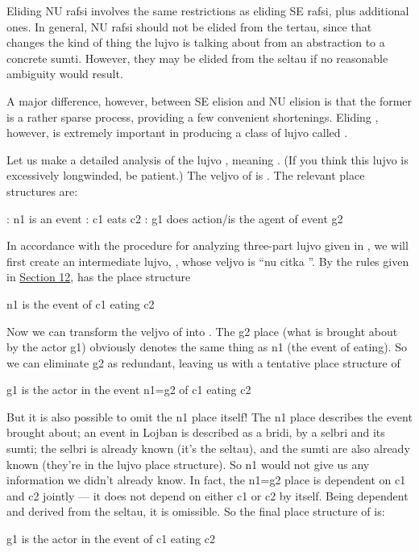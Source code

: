 Eliding NU rafsi involves the same restrictions as eliding
    SE rafsi, plus additional ones. In general, NU rafsi should not
    be elided from the tertau, since that changes the kind of thing
    the lujvo is talking about from an abstraction to a concrete
    sumti. However, they may be elided from the seltau if no
    reasonable ambiguity would result.

A major difference, however, between SE elision and NU
    elision is that the former is a rather sparse process,
    providing a few convenient shortenings. Eliding ,
    however, is extremely important in producing a class of lujvo
    called .

Let us make a detailed analysis of the lujvo
    , meaning . (If you think this lujvo
    is excessively longwinded, be patient.) The veljvo of
     is . The relevant place
    structures are:
\begin{example}
: n1 is an event\n
{}: c1 eats c2\n
{}: g1 does action/is the agent of event g2
\end{example}

In accordance with the procedure for analyzing three-part
    lujvo given in , we will first
    create an intermediate lujvo, , whose veljvo is ``nu
    citka ''. By the rules given in \hyperref[sec:12:12]{Section
    12},  has the place structure
\begin{example}
n1 is the event of c1 eating c2
\end{example}

Now we can transform the veljvo of  into
    . The g2 place (what is brought about by the
    actor g1) obviously denotes the same thing as n1 (the event of
    eating). So we can eliminate g2 as redundant, leaving us with a
    tentative place structure of
\begin{example}
g1 is the actor in the event n1=g2 of c1 eating c2
\end{example}

But it is also possible to omit the n1 place itself! The n1
    place describes the event brought about; an event in Lojban is
    described as a bridi, by a selbri and its sumti; the selbri is
    already known (it's the seltau), and the sumti are also already
    known (they're in the lujvo place structure). So n1 would not
    give us any information we didn't already know. In fact, the
    n1=g2 place is dependent on c1 and c2 jointly --- it does not
    depend on either c1 or c2 by itself. Being dependent and
    derived from the seltau, it is omissible. So the final place
    structure of  is:
\begin{example}
g1 is the actor in the event of c1 eating c2
\end{example}

